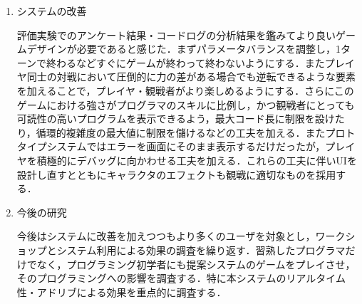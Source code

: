 \begin{enumerate}
  \item システムの改善

  評価実験でのアンケート結果・コードログの分析結果を鑑みてより良いゲームデザインが必要であると感じた．まずパラメータバランスを調整し，1ターンで終わるなどすぐにゲームが終わって終わないようにする．またプレイヤ同士の対戦において圧倒的に力の差がある場合でも逆転できるような要素を加えることで，プレイヤ・観戦者がより楽しめるようにする．さらにこのゲームにおける強さがプログラマのスキルに比例し，かつ観戦者にとっても可読性の高いプログラムを表示できるよう，最大コード長に制限を設けたり，循環的複雑度の最大値に制限を儲けるなどの工夫を加える．またプロトタイプシステムではエラーを画面にそのまま表示するだけだったが，プレイヤを積極的にデバッグに向かわせる工夫を加える．これらの工夫に伴いUIを設計し直すとともにキャラクタのエフェクトも観戦に適切なものを採用する．

  \item 今後の研究

  今後はシステムに改善を加えつつもより多くのユーザを対象とし，ワークショップとシステム利用による効果の調査を繰り返す．習熟したプログラマだけでなく，プログラミング初学者にも提案システムのゲームをプレイさせ，そのプログラミングへの影響を調査する．特に本システムのリアルタイム性・アドリブによる効果を重点的に調査する．
\end{enumerate}

